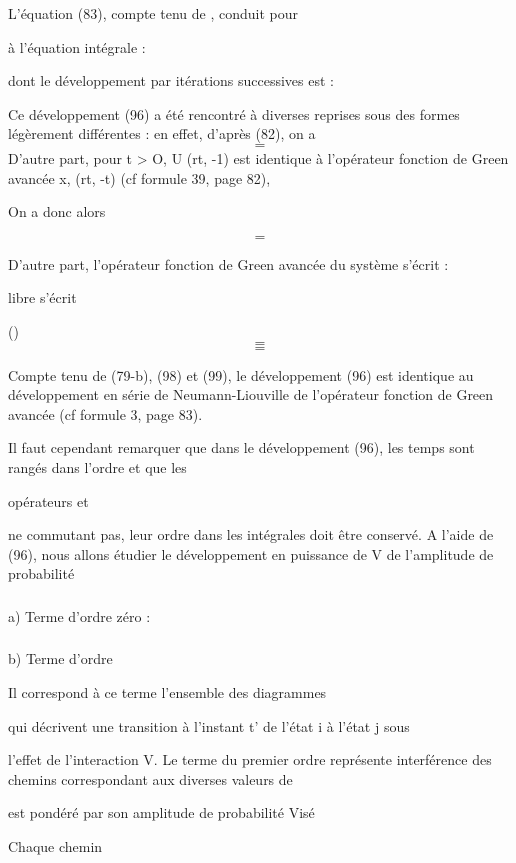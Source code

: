 {{{L'équation (83), compte tenu de , conduit pour

%
 à l'équation intégrale :

dont le développement par itérations successives est :

Ce développement (96) a été rencontré à diverses reprises sous des
formes légèrement différentes : en effet, d'après (82), on a
\[
\tag{97}=
\]
D'autre part, pour t > O, U (rt, -1) est identique à l'opérateur
fonction de Green avancée x, (rt, -t) (cf formule 39, page 82),

On a donc alors

\[
\tag{98}=
\]

D'autre part, l'opérateur fonction de Green avancée du système
 s'écrit :

libre  s'écrit

()
\[
\tag{99}=
\]
\[
\tag{100}=
\]


Compte tenu de (79-b), (98) et (99), le développement (96) est identique au
développement en série de Neumann-Liouville de l'opérateur fonction de Green
avancée (cf formule 3, page 83).

Il faut cependant remarquer que dans le développement (96),
les temps sont rangés  dans l'ordre  et que les

opérateurs  et 

ne commutant pas, leur ordre dans les intégrales doit être conservé.
A l'aide de (96), nous allons étudier le développement en
puissance de V de l'amplitude de probabilité

\subsubsection{}%
a) Terme d'ordre zéro :

\subsubsection{}%
b) Terme d'ordre 

Il correspond à ce terme l'ensemble des diagrammes

qui décrivent une transition à l'instant t' de l'état i à l'état j sous

l'effet de l'interaction V. Le terme du premier ordre représente  interférence
des chemins correspondant aux diverses valeurs de 

est pondéré par son amplitude de probabilité  Visé

Chaque chemin

}}}
